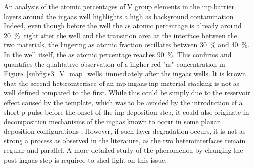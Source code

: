 An analysis of the atomic percentages of V group elements in the \acs{inp} barrier layers around the \acs{ingaas} well highlights a high \acl{as} background contamination. Indeed, even though before the well the \acl{as} atomic percentage is already around \qty{20}{\%}, right after the well and the transition area at the interface between the two materials, the lingering \acl{as} atomic fraction oscillates between \qty{30}{\%} and \qty{40}{\%}. In the well itself, the \acl{as} atomic percentage reaches \qty{90}{\%}. This confirms and quantifies the qualitative observation of a higher red "\acl{as}" concentration in Figure~\ref{subfig:s3_V_map_wells} immediately after the \acs{ingaas} wells. It is known that the second heterointerface of an \acs{inp}-\acs{ingaas}-\acs{inp} material stacking is not as well defined compared to the first. While this could be simply due to the reservoir effect caused by the template, which was to be avoided by the introduction of a short \acl{p} pulse before the onset of the \acs{inp} deposition step, it could also originate in decomposition mechanisms of the \acs{ingaas} known to occur in some planar deposition configurations \cite{Decobert2002}. However, if such layer degradation occurs, it is not as strong a process as observed in the literature, as the two heterointerfaces remain regular and parallel. A more detailed study of the phenomenon by changing the post-\acs{ingaas} step is required to shed light on this issue.
\par

